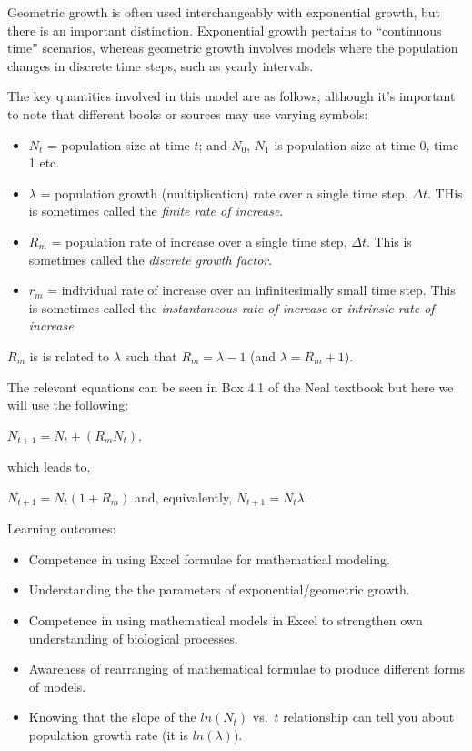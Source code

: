 \documentclass[
  a4paper]{book}
\providecommand{\tightlist}{%
  \setlength{\itemsep}{0pt}\setlength{\parskip}{0pt}}
\begin{document}
Geometric growth is often used interchangeably with exponential growth, but there is an important distinction. Exponential growth pertains to ``continuous time'' scenarios, whereas geometric growth involves models where the population changes in discrete time steps, such as yearly intervals.

The key quantities involved in this model are as follows, although it's important to note that different books or sources may use varying symbols:

\begin{itemize}
\tightlist
\item
  \(N_t\) = population size at time \(t\); and \(N_0\), \(N_1\) is population size at time 0, time 1 etc.
\item
  \(\lambda\) = population growth (multiplication) rate over a single time step, \(\Delta t\). THis is sometimes called the \emph{finite rate of increase}.
\item
  \(R_m\) = population rate of increase over a single time step, \(\Delta t\). This is sometimes called the \emph{discrete growth factor}.
\item
  \(r_m\) = individual rate of increase over an infinitesimally small time step. This is sometimes called the \emph{instantaneous rate of increase} or \emph{intrinsic rate of increase}
\end{itemize}

\(R_m\) is is related to \(\lambda\) such that \(R_m = \lambda - 1\) (and \(\lambda = R_m + 1\)).

The relevant equations can be seen in Box 4.1 of the Neal textbook but here we will use the following:

\(N_{t+1} = N_t + (R_m N_t)\),

which leads to,

\(N_{t+1} = N_t (1 + R_m)\) and, equivalently, \(N_{t+1} = N_t \lambda\).

\begin{do-something}
Learning outcomes:

\begin{itemize}
\tightlist
\item
  Competence in using Excel formulae for mathematical modeling.
\item
  Understanding the the parameters of exponential/geometric growth.
\item
  Competence in using mathematical models in Excel to strengthen own
  understanding of biological processes.
\item
  Awareness of rearranging of mathematical formulae to produce different
  forms of models.
\item
  Knowing that the slope of the \(ln(N_t)\) vs.~\(t\) relationship can
  tell you about population growth rate (it is \(ln(\lambda)\)).
\end{itemize}
\end{do-something}
\end{document}
